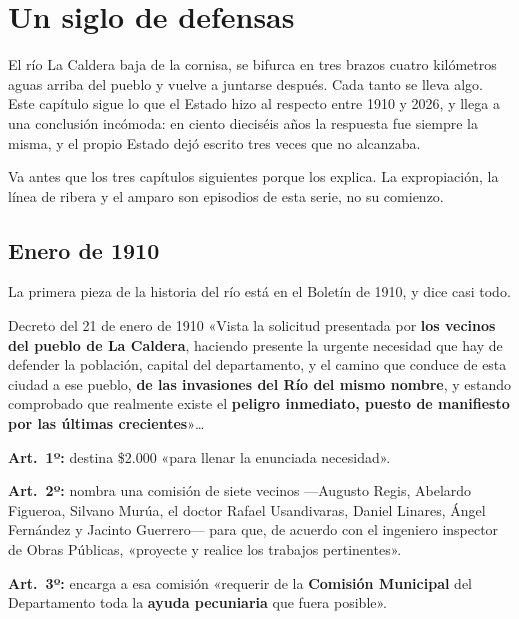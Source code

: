 \chapter{Un siglo de defensas}

\label{cap:defensas}
El río La Caldera baja de la cornisa, se bifurca en tres brazos cuatro kilómetros aguas
arriba del pueblo y vuelve a juntarse después. Cada tanto se lleva algo. Este capítulo sigue
lo que el Estado hizo al respecto entre 1910 y 2026, y llega a una conclusión incómoda: en
ciento dieciséis años la respuesta fue siempre la misma, y el propio Estado dejó escrito tres
veces que no alcanzaba.

Va antes que los tres capítulos siguientes porque los explica. La expropiación, la línea de ribera y el amparo son episodios de esta serie, no su comienzo.

\section{Enero de 1910}

La primera pieza de la historia del río está en el Boletín de 1910, y dice casi todo.

\begin{ficha}{Decreto del 21 de enero de 1910}
«Vista la solicitud presentada por \textbf{los vecinos del pueblo de La Caldera}, haciendo
presente la urgente necesidad que hay de defender la población, capital del departamento,
y el camino que conduce de esta ciudad a ese pueblo, \textbf{de las invasiones del Río del
mismo nombre}, y estando comprobado que realmente existe el \textbf{peligro inmediato,
puesto de manifiesto por las últimas crecientes}»\ldots

\textbf{Art.\ 1º:} destina \$2.000 «para llenar la enunciada necesidad».

\textbf{Art.\ 2º:} nombra una comisión de siete vecinos —Augusto Regis, Abelardo Figueroa,
Silvano Murúa, el doctor Rafael Usandivaras, Daniel Linares, Ángel Fernández y Jacinto
Guerrero— para que, de acuerdo con el ingeniero inspector de Obras Públicas, «proyecte y
realice los trabajos pertinentes».

\textbf{Art.\ 3º:} encarga a esa comisión «requerir de la \textbf{Comisión Municipal} del
Departamento toda la \textbf{ayuda pecuniaria} que fuera posible».
\end{ficha}

